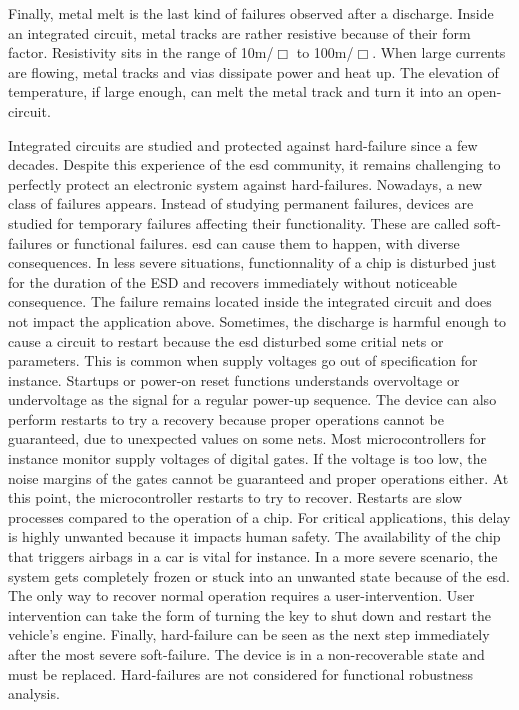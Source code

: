 Finally, metal melt is the last kind of failures observed after a discharge.
Inside an integrated circuit, metal tracks are rather resistive because of their form factor.
Resistivity sits in the range of 10m\textOmega{}/$\Box$ to 100m\textOmega/$\Box$.
When large currents are flowing, metal tracks and vias dissipate power and heat up.
The elevation of temperature, if large enough, can melt the metal track and turn it into an open-circuit.

Integrated circuits are studied and protected against hard-failure since a few decades.
Despite this experience of the \gls{esd} community, it remains challenging to perfectly protect an electronic system against hard-failures.
Nowadays, a new class of failures appears.
Instead of studying permanent failures, devices are studied for temporary failures affecting their functionality.
These are called soft-failures or functional failures.
\gls{esd} can cause them to happen, with diverse consequences.
In less severe situations, functionnality of a chip is disturbed just for the duration of the ESD and recovers immediately without noticeable consequence.
The failure remains located inside the integrated circuit and does not impact the application above.
Sometimes, the discharge is harmful enough to cause a circuit to restart because the \gls{esd} disturbed some critial nets or parameters.
This is common when supply voltages go out of specification for instance.
Startups or power-on reset functions understands overvoltage or undervoltage as the signal for a regular power-up sequence.
The device can also perform restarts to try a recovery because proper operations cannot be guaranteed, due to unexpected values on some nets.
Most microcontrollers for instance monitor supply voltages of digital gates.
If the voltage is too low, the noise margins of the gates cannot be guaranteed and proper operations either.
At this point, the microcontroller restarts to try to recover.
Restarts are slow processes compared to the operation of a chip.
For critical applications, this delay is highly unwanted because it impacts human safety.
The availability of the chip that triggers airbags in a car is vital for instance.
In a more severe scenario, the system gets completely frozen or stuck into an unwanted state because of the \gls{esd}.
The only way to recover normal operation requires a user-intervention.
User intervention can take the form of turning the key to shut down and restart the vehicle's engine.
Finally, hard-failure can be seen as the next step immediately after the most severe soft-failure.
The device is in a non-recoverable state and must be replaced.
Hard-failures are not considered for functional robustness analysis.


